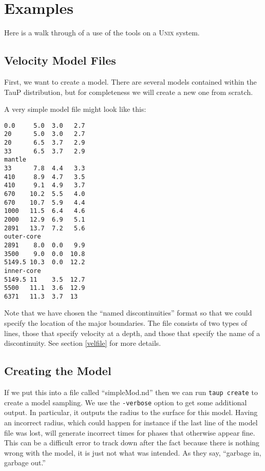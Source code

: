 
\section{Examples} \label{exampleCreate}

Here is a walk through of a use of the tools on a \textsc{Unix} system.

\subsection{Velocity Model Files} \label{exampleND}
First, we want to create a model. There are several models contained within
the TauP distribution, but for completeness we will create a new one
from scratch.

A very simple model file might look like this:

\begin{verbatim}
0.0     5.0  3.0   2.7
20      5.0  3.0   2.7
20      6.5  3.7   2.9
33      6.5  3.7   2.9
mantle
33      7.8  4.4   3.3
410     8.9  4.7   3.5
410     9.1  4.9   3.7
670    10.2  5.5   4.0
670    10.7  5.9   4.4
1000   11.5  6.4   4.6
2000   12.9  6.9   5.1
2891   13.7  7.2   5.6
outer-core
2891    8.0  0.0   9.9
3500    9.0  0.0  10.8
5149.5 10.3  0.0  12.2
inner-core
5149.5 11    3.5  12.7
5500   11.1  3.6  12.9
6371   11.3  3.7  13
\end{verbatim}

Note that we have chosen the ``named discontinuities'' format so
that we could specify the location of the major boundaries.
The file consists of two types of lines, those that specify velocity at a depth,
and those that specify the name of a discontinuity. See section \ref{velfile}
for more details.

\subsection{Creating the Model}

If we put this into a file called ``simpleMod.nd'' then we can run
\texttt{taup create} to create a model sampling. We use the
\texttt{-verbose} option to get some additional output. In particular,
it outputs the radius to the surface for this model. Having an incorrect
radius, which could happen for instance
if the last line of the model file was lost,
will generate incorrect times for phases that otherwise appear fine.
This can be a difficult error to track down after the fact because
there is nothing wrong with the model, it is just not what was intended.
As they say, ``garbage in, garbage out.''


